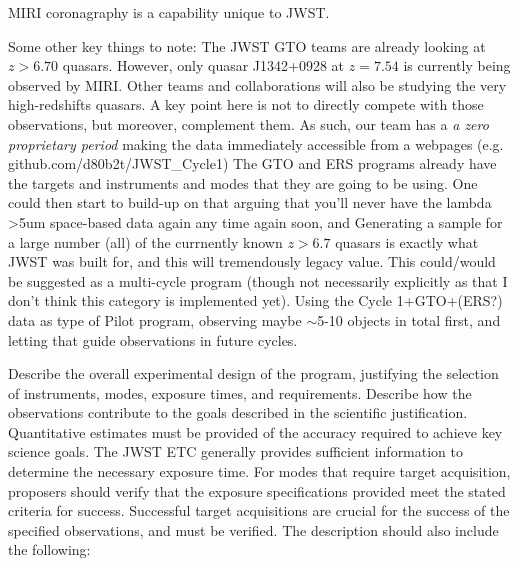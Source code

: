 \documentclass[12pt]{article}
\begin{document}
MIRI coronagraphy is a capability unique to JWST.

Some other key things to note:  
The JWST GTO teams are already looking at $z>6.70$ quasars. 
However, %
only quasar J1342+0928 at $z=7.54$ is currently being observed by MIRI. 
Other teams and collaborations will also be studying the very high-redshifts quasars. 
A key point here is not to directly compete with those observations, but moreover, complement them.
As such, our team has a {\it a zero  proprietary period} making the data immediately accessible from
a webpages (e.g. github.com/d80b2t/JWST\_Cycle1)
The GTO and ERS programs already have the targets and instruments and modes 
that they are going to be using. One could then start to build-up on that arguing that 
you’ll never have the lambda >5um space-based data again any time again soon, 
and
Generating a sample for a large number (all) of the currnently known $z>6.7$ quasars is exactly 
what JWST was built for, and this will tremendously legacy value. 
This could/would be suggested as a multi-cycle program (though not necessarily explicitly 
as that I don’t think this category is implemented yet). Using the Cycle 1+GTO+(ERS?) 
data as type of Pilot program, observing maybe $\sim$5-10 objects in total first, and letting 
that guide observations in future cycles. 

















%
%
\justifyobservations   %
Describe the overall experimental design of the program, justifying the selection of instruments, modes, exposure times, and requirements. Describe how the observations contribute to the goals described in the scientific justification. Quantitative estimates must be provided of the accuracy required to achieve key science goals. The JWST ETC generally provides sufficient information to determine the necessary exposure time. For modes that require target acquisition, proposers should verify that the exposure specifications provided meet the stated criteria for success. Successful target acquisitions are crucial for the success of the specified observations, and must be verified. The description should also include the following:
\end{document}
